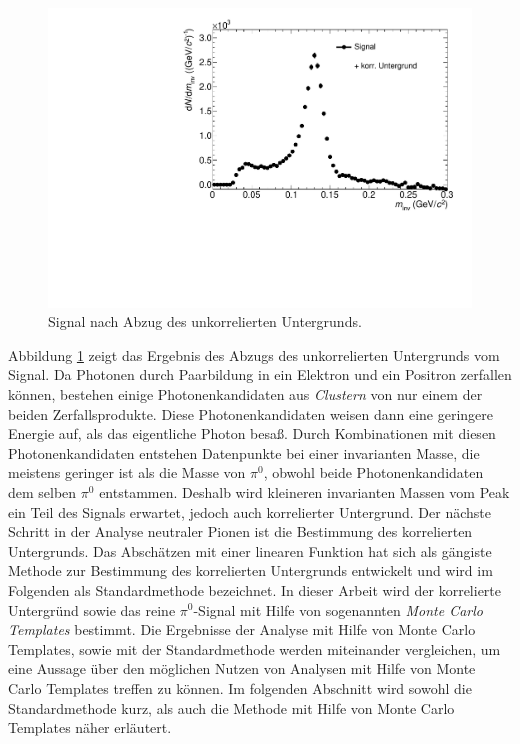 \begin{figure}[tbp]
\centering
\includegraphics[width=.75\linewidth]{hInvMass_Data.pdf}
\caption{Signal nach Abzug des unkorrelierten Untergrunds.}
\label{figInvMass_Data}
\end{figure}
\newline
Abbildung \ref{figInvMass_Data} zeigt das Ergebnis des Abzugs des unkorrelierten Untergrunds vom Signal.
Da Photonen durch Paarbildung in ein Elektron und ein Positron zerfallen k\"onnen, bestehen einige Photonenkandidaten aus \textit{Clustern} von nur einem der beiden Zerfallsprodukte.
Diese Photonenkandidaten weisen dann eine geringere Energie auf, als das eigentliche Photon besa{\ss}.
Durch Kombinationen mit diesen Photonenkandidaten entstehen Datenpunkte bei einer invarianten Masse, die meistens geringer ist als die Masse von $\pi^{0}$, obwohl beide Photonenkandidaten dem selben $\pi^{0}$ entstammen.
Deshalb wird kleineren invarianten Massen vom Peak ein Teil des Signals erwartet, jedoch auch korrelierter Untergrund.
\newline
Der n\"achste Schritt in der Analyse neutraler Pionen ist die Bestimmung des korrelierten Untergrunds.
Das Absch\"atzen mit einer linearen Funktion hat sich als g\"angiste Methode zur Bestimmung des korrelierten Untergrunds entwickelt und wird im Folgenden als Standardmethode bezeichnet.
In dieser Arbeit wird der korrelierte Untergr\"und sowie das reine $\pi^{0}$-Signal mit Hilfe von sogenannten \textit{Monte Carlo Templates} bestimmt.
Die Ergebnisse der Analyse mit Hilfe von Monte Carlo Templates, sowie mit der Standardmethode werden miteinander vergleichen, um eine Aussage \"uber den m\"oglichen Nutzen von Analysen mit Hilfe von Monte Carlo Templates treffen zu k\"onnen.
Im folgenden Abschnitt wird sowohl die Standardmethode kurz, als auch die Methode mit Hilfe von Monte Carlo Templates n\"aher erl\"autert.